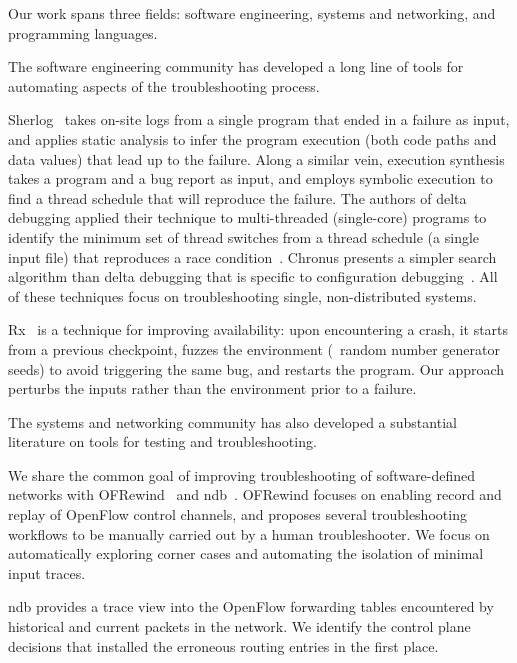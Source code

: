 Our work spans three fields: software engineering, systems and networking, and
programming languages.

The software engineering community has developed a long line of tools for automating
aspects of the troubleshooting process.

Sherlog~\cite{Yuan:2010:SED:1736020.1736038} takes on-site logs from a
single program that ended in a failure as input, and applies static analysis to infer the
program execution (both code paths and data values) that lead up to the failure.
Along a similar vein, execution
synthesis~\cite{Zamfir:2010:EST:1755913.1755946} takes a program and a bug
report as input, and employs symbolic execution to find a thread schedule that will
reproduce the failure. The authors of delta debugging
applied their technique to multi-threaded (single-core) programs
to identify the minimum set of thread
switches from a thread schedule (a single input file) that reproduces
a race condition~\cite{choi2002isolating}. Chronus presents a simpler search
algorithm than delta debugging that is specific to configuration
debugging~\cite{whitaker2004configuration}.
All of these techniques focus on troubleshooting single, non-distributed
systems.

Rx~\cite{qin2005rx} is a technique for improving availability: upon
encountering a crash, it starts from a previous checkpoint, fuzzes
the environment (\eg~random number generator seeds) to avoid triggering the same bug,
and restarts the program. Our
approach perturbs the inputs rather than the environment
prior to a failure.

The systems and networking community has also developed a substantial
literature on tools for testing and troubleshooting.

We share the common goal of improving troubleshooting
of software-defined networks with OFRewind~\cite{ofrewind} and
ndb~\cite{handigol2012debugger}. OFRewind focuses on enabling
record and replay of OpenFlow control channels, and
proposes several troubleshooting workflows to be manually carried out by a human
troubleshooter. We focus on automatically exploring corner cases and automating
the isolation of minimal input traces.

ndb provides a
trace view into the OpenFlow forwarding tables
encountered by historical and current packets in the network.
We identify the control plane decisions that installed the
erroneous routing entries in the first place.


